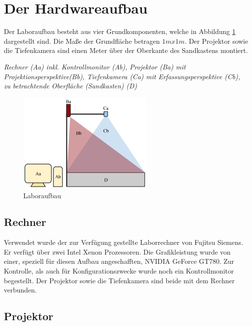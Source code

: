 \section{Der Hardwareaufbau}
\begin{Spacing}{\mylinespace}

Der Laboraufbau besteht aus vier Grundkomponenten, welche in Abbildung \ref{fig:labor} dargestellt sind. Die Maße der Grundfläche betragen $1m x 1m$. Der Projektor sowie die Tiefenkamera sind einen Meter über der Oberkante des Sandkastens montiert.

\vspace{0.2cm}
\textit{Rechner (Aa) inkl. Kontrollmonitor (Ab), Projektor (Ba) mit Projektionsperspektive(Bb), Tiefenkamera (Ca) mit Erfassungsperspektive (Cb), zu betrachtende Oberfläche (Sandkasten) (D)}

\begin{figure}[hbtp]
	\centering
	\includegraphics[width=0.6\textwidth]{graphics/Aufbau.png}
	\caption{Laboraufbau}
	\label{fig:labor}
\end{figure}

\subsection{Rechner}

Verwendet wurde der zur Verfügung gestellte Laborrechner von Fujitsu Siemens. Er verfügt über zwei Intel Xenon Prozessoren. Die Grafikleistung wurde von einer, speziell für diesen Aufbau angeschafften, NVIDIA GeForce GT780. Zur Kontrolle, als auch für Konfigurationszwecke wurde noch ein Kontrollmonitor begestellt. Der Projektor sowie die Tiefenkamera sind beide mit dem Rechner verbunden.

\subsection{Projektor}


\end{Spacing}
